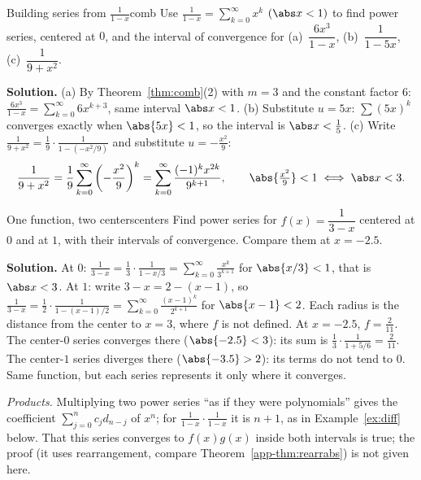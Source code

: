 \documentclass[11pt]{article}
\begin{document}
\begin{exmp}{Building series from $\frac1{1-x}$}{comb}
Use $\frac1{1-x}=\sum_{k=0}^\infty x^k$ $(\abs x<1)$ to find power series, centered at $0$, and the interval of convergence for (a)~$\dfrac{6x^3}{1-x}$, (b)~$\dfrac1{1-5x}$, (c)~$\dfrac1{9+x^2}$.

\textbf{Solution.} (a) By Theorem~\ref{thm:comb}(2) with $m=3$ and the constant factor $6$: $\frac{6x^3}{1-x}=\sum_{k=0}^\infty6x^{k+3}$, same interval $\abs x<1$. (b) Substitute $u=5x$: $\sum(5x)^k$ converges exactly when $\abs{5x}<1$, so the interval is $\abs x<\frac15$. (c) Write $\frac1{9+x^2}=\frac19\cdot\frac1{1-(-x^2/9)}$ and substitute $u=-\frac{x^2}9$:
\[
\frac1{9+x^2}=\frac19\sum_{k=0}^\infty\left(-\frac{x^2}9\right)^k=\sum_{k=0}^\infty\frac{(-1)^kx^{2k}}{9^{k+1}},\qquad\abs{\tfrac{x^2}9}<1\iff\abs x<3 .
\]
\end{exmp}

\begin{exmp}{One function, two centers}{centers}
Find power series for $f(x)=\dfrac1{3-x}$ centered at $0$ and at $1$, with their intervals of convergence. Compare them at $x=-2.5$.

\textbf{Solution.} At $0$: $\frac1{3-x}=\frac13\cdot\frac1{1-x/3}=\sum_{k=0}^\infty\frac{x^k}{3^{k+1}}$ for $\abs{x/3}<1$, that is $\abs x<3$. At $1$: write $3-x=2-(x-1)$, so $\frac1{3-x}=\frac12\cdot\frac1{1-(x-1)/2}=\sum_{k=0}^\infty\frac{(x-1)^k}{2^{k+1}}$ for $\abs{x-1}<2$. Each radius is the distance from the center to $x=3$, where $f$ is not defined. At $x=-2.5$, $f=\frac2{11}$. The center-$0$ series converges there ($\abs{-2.5}<3$): its sum is $\frac13\cdot\frac1{1+5/6}=\frac2{11}$. The center-$1$ series diverges there ($\abs{-3.5}>2$): its terms do not tend to $0$. Same function, but each series represents it only where it converges.
\end{exmp}

\emph{Products.} Multiplying two power series ``as if they were polynomials'' gives the coefficient $\sum_{j=0}^nc_jd_{n-j}$ of $x^n$; for $\frac1{1-x}\cdot\frac1{1-x}$ it is $n+1$, as in Example~\ref{ex:diff} below. That this series converges to $f(x)g(x)$ inside both intervals is true; the proof (it uses rearrangement, compare Theorem~\ref{app-thm:rearrabs}) is not given here.
\end{document}
